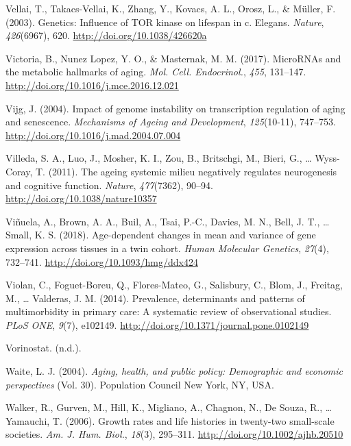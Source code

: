 \documentclass[12pt,twoside]{unicam}
\begin{document}
\begin{cslreferences}
\leavevmode\hypertarget{ref-Vellai2003}{}%
Vellai, T., Takacs-Vellai, K., Zhang, Y., Kovacs, A. L., Orosz, L., \& Müller, F. (2003). Genetics: Influence of TOR kinase on lifespan in c. Elegans. \emph{Nature}, \emph{426}(6967), 620. \url{http://doi.org/10.1038/426620a}

\leavevmode\hypertarget{ref-Victoria2017}{}%
Victoria, B., Nunez Lopez, Y. O., \& Masternak, M. M. (2017). MicroRNAs and the metabolic hallmarks of aging. \emph{Mol. Cell. Endocrinol.}, \emph{455}, 131--147. \url{http://doi.org/10.1016/j.mce.2016.12.021}

\leavevmode\hypertarget{ref-Vijg2004}{}%
Vijg, J. (2004). Impact of genome instability on transcription regulation of aging and senescence. \emph{Mechanisms of Ageing and Development}, \emph{125}(10-11), 747--753. \url{http://doi.org/10.1016/j.mad.2004.07.004}

\leavevmode\hypertarget{ref-Villeda2011}{}%
Villeda, S. A., Luo, J., Mosher, K. I., Zou, B., Britschgi, M., Bieri, G., \ldots{} Wyss-Coray, T. (2011). The ageing systemic milieu negatively regulates neurogenesis and cognitive function. \emph{Nature}, \emph{477}(7362), 90--94. \url{http://doi.org/10.1038/nature10357}

\leavevmode\hypertarget{ref-Vinuela2018}{}%
Viñuela, A., Brown, A. A., Buil, A., Tsai, P.-C., Davies, M. N., Bell, J. T., \ldots{} Small, K. S. (2018). Age-dependent changes in mean and variance of gene expression across tissues in a twin cohort. \emph{Human Molecular Genetics}, \emph{27}(4), 732--741. \url{http://doi.org/10.1093/hmg/ddx424}

\leavevmode\hypertarget{ref-Violan2014}{}%
Violan, C., Foguet-Boreu, Q., Flores-Mateo, G., Salisbury, C., Blom, J., Freitag, M., \ldots{} Valderas, J. M. (2014). Prevalence, determinants and patterns of multimorbidity in primary care: A systematic review of observational studies. \emph{PLoS ONE}, \emph{9}(7), e102149. \url{http://doi.org/10.1371/journal.pone.0102149}

\leavevmode\hypertarget{ref-vorinostat}{}%
Vorinostat. (n.d.).

\leavevmode\hypertarget{ref-Waite2004}{}%
Waite, L. J. (2004). \emph{Aging, health, and public policy: Demographic and economic perspectives} (Vol. 30). Population Council New York, NY, USA.

\leavevmode\hypertarget{ref-Walker2006}{}%
Walker, R., Gurven, M., Hill, K., Migliano, A., Chagnon, N., De Souza, R., \ldots{} Yamauchi, T. (2006). Growth rates and life histories in twenty-two small-scale societies. \emph{Am. J. Hum. Biol.}, \emph{18}(3), 295--311. \url{http://doi.org/10.1002/ajhb.20510}


\end{cslreferences}
\end{document}
